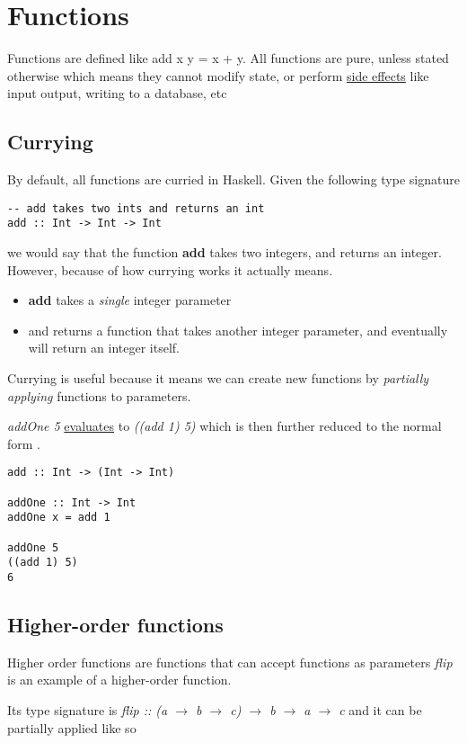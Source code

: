 \section{Functions}
Functions are defined like add x y = x + y. All functions are pure, unless stated otherwise which means
they cannot modify state, or perform \underline{side effects} like input output, writing to a database, etc

\subsection{Currying}
By default, all functions are curried in Haskell. Given the following type signature

\begin{lstlisting}
-- add takes two ints and returns an int
add :: Int -> Int -> Int
\end{lstlisting}

we would say that the function \textbf{add} takes two integers, and returns an integer.
However, because of how currying works it actually means.

\begin{itemize}
    \item \textbf{add} takes a \emph{single} integer parameter
    \item and returns a function that takes another integer parameter, and eventually
    will return an integer itself.
\end{itemize}

Currying is useful because it means we can create new functions by \emph{partially applying}
functions to parameters.

\emph{addOne 5} \underline{evaluates} to \emph{((add 1) 5)} which is then further reduced to
the normal form .

\begin{lstlisting}
add :: Int -> (Int -> Int)

addOne :: Int -> Int
addOne x = add 1

addOne 5
((add 1) 5)
6
\end{lstlisting}

\subsection{Higher-order functions}
Higher order functions are functions that can accept functions as parameters
\emph{flip} is an example of a higher-order function.

Its type signature is \emph{flip :: (a $\rightarrow$ b $\rightarrow$ c) $\rightarrow$ b $\rightarrow$ a $\rightarrow$ c}
and it can be partially applied like so

